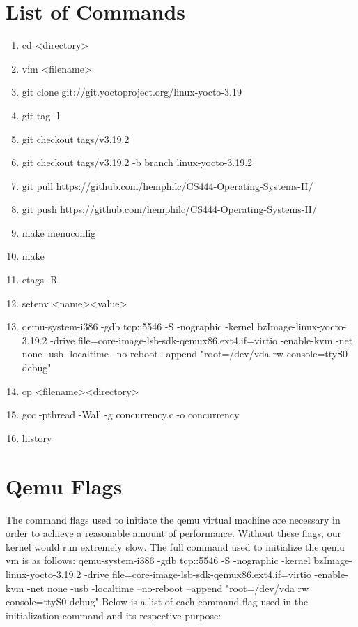 \documentclass[onecolumn, draftclsnofoot,10pt, compsoc]{IEEEtran}
\begin{document}

\section{List of Commands}

\begin{enumerate}
\item cd \textless directory\textgreater
\item vim \textless filename\textgreater
\item git clone git://git.yoctoproject.org/linux-yocto-3.19
\item git tag -l
\item git checkout tags/v3.19.2
\item git checkout tags/v3.19.2 -b branch linux-yocto-3.19.2
\item git pull https://github.com/hemphilc/CS444-Operating-Systems-II/
\item git push https://github.com/hemphilc/CS444-Operating-Systems-II/
\item make menuconfig
\item make
\item ctags -R
\item setenv \textless name\textgreater \textless value\textgreater
\item qemu-system-i386 -gdb tcp::5546 -S -nographic -kernel bzImage-linux-yocto-3.19.2 -drive file=core-image-lsb-sdk-qemux86.ext4,if=virtio -enable-kvm -net none -usb -localtime --no-reboot --append "root=/dev/vda rw console=ttyS0 debug"
\item cp \textless filename\textgreater \textless directory\textgreater
\item gcc -pthread -Wall -g concurrency.c -o concurrency
\item history
\end{enumerate}

\section{Qemu Flags}
The command flags used to initiate the qemu virtual machine are necessary in order to achieve a reasonable amount of performance. Without these flags, our kernel would run extremely slow. The full command used to initialize the qemu vm is as follows:\newline
\newline
\noindent qemu-system-i386 -gdb tcp::5546 -S -nographic -kernel bzImage-linux-yocto-3.19.2 -drive file=core-image-lsb-sdk-\newline qemux86.ext4,if=virtio -enable-kvm -net none -usb -localtime --no-reboot --append "root=/dev/vda rw console=ttyS0 debug"\newline
\newline
Below is a list of each command flag used in the initialization command and its respective purpose:
\end{document}
